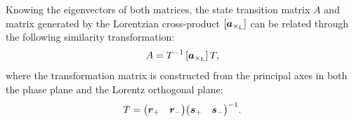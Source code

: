 Knowing the eigenvectors of both matrices, the state transition matrix \(A\) and matrix generated by the Lorentzian cross-product \([\vec{a}_{\lorcrossp{}{}}]\) can be related through the following similarity transformation:
\begin{equation}
     A = T^{-1}\,[\vec{a}_{\lorcrossp{}{}}]\,T,
\end{equation}
where the transformation matrix is constructed from the principal axes in both the phase plane and the Lorentz orthogonal plane:
\begin{equation}
     T = \mqty(\vec{r}_+ & \vec{r}_-) \mqty(\vec{s}_+ & \vec{s}_-)^{-1}.
\end{equation}

